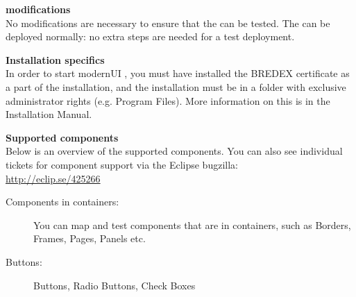 \textbf{\gdaut{} modifications}\\
No modifications are necessary to ensure that the \gdaut{} can be tested. The \gdaut{} can be deployed normally: no extra steps are needed for a test deployment.

\textbf{Installation specifics}\\
In order to start modernUI \gdauts{}, you must have installed the BREDEX certificate as a part of the installation, and the installation must be in a folder with exclusive administrator rights (e.g. Program Files). More information on this is in the Installation Manual. 

\textbf{Supported components}\\
Below is an overview of the supported components. You can also see individual tickets for component support via the Eclipse bugzilla:\\
\url{http://eclip.se/425266}
\begin{description}
\item [Components in containers:]{You can map and test components that are in containers, such as Borders, Frames, Pages, Panels etc.}
\item [Buttons:]{Buttons, Radio Buttons, Check Boxes}
\end{description}
